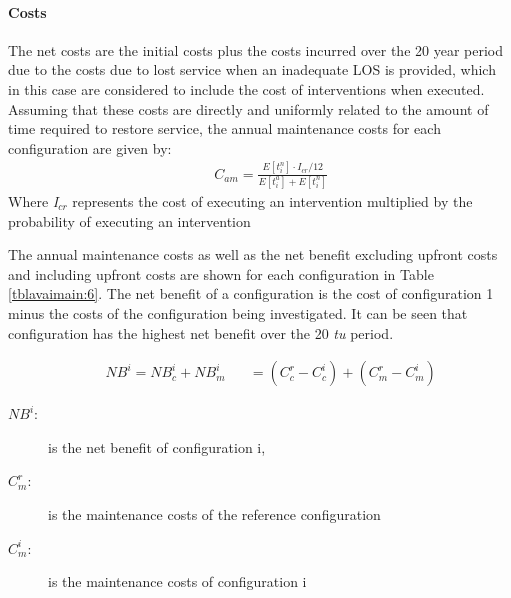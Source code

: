\paragraph{Costs}
The net costs are the initial costs plus the costs incurred over the 20 year
period due to the costs due to lost service when an inadequate LOS is provided,
which in this case are considered to include the cost of interventions when
executed. Assuming that these costs are directly and uniformly related to the
amount of time required to restore service, the annual maintenance costs for each
configuration are given by:
\begin{eqnarray}
&& {C_{am}} = \frac{{E\left[ {t_i^n} \right] \cdot {I_{cr}}/12}}{{E\left[ {t_i^a}
\right] + E\left[ {t_i^n} \right]}}
\end{eqnarray}
Where \textit{I$_{cr}$} represents the cost of executing an intervention
multiplied by the probability of executing an intervention

The annual maintenance costs as well as the net benefit excluding upfront costs
and including upfront costs are shown for each configuration in Table
\ref{tblavaimain:6}. The net benefit of a configuration is the cost of configuration 1
minus the costs of the configuration being investigated. It can be seen that
configuration has the highest net benefit over the 20 \textit{tu} period.

\begin{eqnarray}
&& N{B^i} = NB_c^i + NB_m^i\,\,\,\,\,\,\,\,\,\, = \left( {C_c^r - C_c^i} \right) +
\left( {C_m^r - C_m^i} \right)
\label{avaimaineq:11}
\end{eqnarray}
\begin{adjustwidth}{1cm}{}
\begin{description}
\item[$N{B^i}$:] is the net benefit of configuration i,
\item[$C_m^r$:] is the maintenance costs of the reference configuration
\item[$C_m^i$:] is the maintenance costs of configuration i
\end{description}
\end{adjustwidth}

